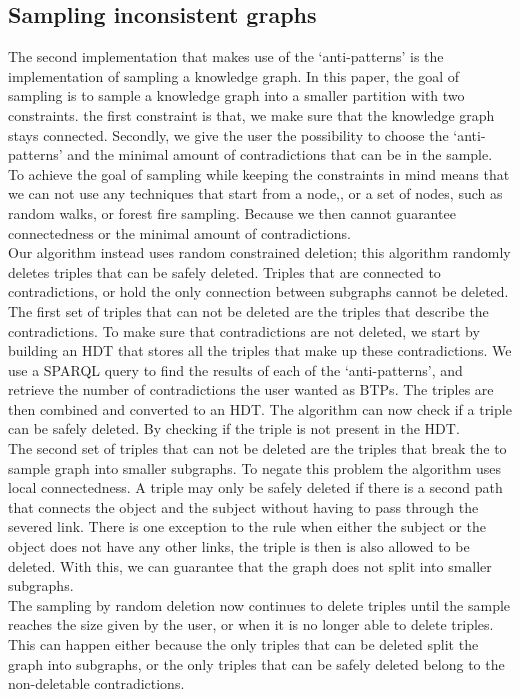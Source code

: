 \documentclass{article}
\begin{document}
\subsection{Sampling inconsistent graphs}
The second implementation that makes use of the `anti-patterns' is the implementation of sampling a knowledge graph. In this paper, the goal of sampling is to sample a knowledge graph into a smaller partition with two constraints. the first constraint is that, we make sure that the knowledge graph stays connected. Secondly, we give the user the possibility to choose the `anti-patterns' and the minimal amount of contradictions that can be in the sample.
To achieve the goal of sampling while keeping the constraints in mind means that we can not use any techniques that start from a node,, or a set of nodes, such as random walks, or forest fire sampling. Because we then cannot guarantee connectedness or the minimal amount of contradictions.\\ 
Our algorithm instead uses random constrained deletion; this algorithm randomly deletes triples that can be safely deleted. Triples that are connected to contradictions, or hold the only connection between subgraphs cannot be deleted.
The first set of triples that can not be deleted are the triples that describe the contradictions. To make sure that contradictions are not deleted, we start by building an HDT\cite{FMPGPA:13}\cite{MPAF:12} that stores all the triples that make up these contradictions. We use a SPARQL query to find the results of each of the `anti-patterns', and retrieve the number of contradictions the user wanted as BTPs. The triples are then combined and converted to an HDT. The algorithm can now check if a triple can be safely deleted. By checking if the triple is not present in the HDT.\\
The second set of triples that can not be deleted are the triples that break the to sample graph into smaller subgraphs. To negate this problem the algorithm uses local connectedness. A triple may only be safely deleted if there is a second path that connects the object and the subject without having to pass through the severed link. There is one exception to the rule when either the subject or the object does not have any other links, the triple is then is also allowed to be deleted. With this, we can guarantee that the graph does not split into smaller subgraphs. \\%
The sampling by random deletion now continues to delete triples until the sample reaches the size given by the user, or when it is no longer able to delete triples. This can happen either because the only triples that can be deleted split the graph into subgraphs, or the only triples that can be safely deleted belong to the non-deletable contradictions.
\end{document}
